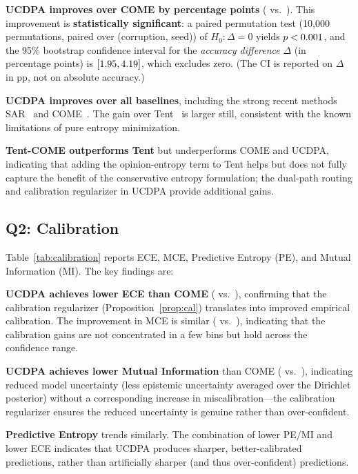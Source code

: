 \textbf{UCDPA improves over COME by \ucdpadelta{} percentage points} (\ucdpaacc{} vs.\ \comeacc{}). This improvement is \textbf{statistically significant}: a paired permutation test (10{,}000 permutations, paired over (corruption, seed)) of $H_0\colon \Delta = 0$ yields $p < 0.001{}$, and the 95\% bootstrap confidence interval for the \emph{accuracy difference} $\Delta$ (in percentage points) is $[1.95{}, 4.19{}]$, which excludes zero. (The CI is reported on $\Delta$ in pp, not on absolute accuracy.)

\textbf{UCDPA improves over all baselines}, including the strong recent methods SAR~\citep{niu2023sar} and COME~\citep{come2024come}. The gain over Tent~\citep{wang2021tent} is larger still, consistent with the known limitations of pure entropy minimization.

\textbf{Tent-COME outperforms Tent} but underperforms COME and UCDPA, indicating that adding the opinion-entropy term to Tent helps but does not fully capture the benefit of the conservative entropy formulation; the dual-path routing and calibration regularizer in UCDPA provide additional gains.

\subsection{Q2: Calibration}
\label{sec:exp:calibration}



Table~\ref{tab:calibration} reports ECE, MCE, Predictive Entropy (PE), and Mutual Information (MI). The key findings are:

\textbf{UCDPA achieves lower ECE than COME} (\ucdpaece{} vs.\ \comeece{}), confirming that the calibration regularizer (Proposition~\ref{prop:cal}) translates into improved empirical calibration. The improvement in MCE is similar (\ucdpamce{} vs.\ \comemce{}), indicating that the calibration gains are not concentrated in a few bins but hold across the confidence range.

\textbf{UCDPA achieves lower Mutual Information} than COME (\ucdpami{} vs.\ \comemi{}), indicating reduced model uncertainty (less epistemic uncertainty averaged over the Dirichlet posterior) without a corresponding increase in miscalibration---the calibration regularizer ensures the reduced uncertainty is genuine rather than over-confident.

\textbf{Predictive Entropy} trends similarly. The combination of lower PE/MI and lower ECE indicates that UCDPA produces sharper, better-calibrated predictions, rather than artificially sharper (and thus over-confident) predictions.

